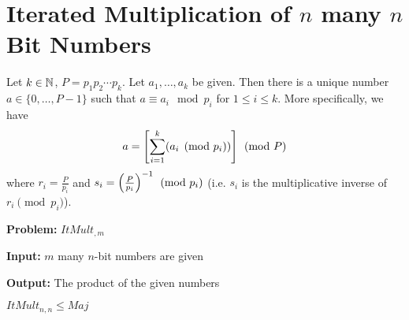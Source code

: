 \section{Iterated Multiplication of $n$ many $n$ Bit Numbers}

\begin{theorem}
	Let $k\in \mathbb{N}$, $P=p_1p_2\cdots p_k$. Let $a_1,\dots, a_k$ be given. Then there is a unique number $a\in \{0,\dots, P-1\}$ such that $a\equiv a_i\mod{p_i}$ for $1\leq i\leq k$. More specifically, we have $$a=\left[ \sum_{i=1}^k (a_i\pmod{p_i}) \right]\pmod{P}$$where $r_i=\frac{P}{p_i}$ and $s_i=\left(\frac{P}{p_i}\right)^{-1} \pmod{p_i}$ (i.e. $s_i$ is the multiplicative inverse of $r_i\pmod{p_i}$).
\end{theorem}
\parinf
\textbf{Problem:} $ItMult_{,m}$

\textbf{Input:} $m$ many $n$-bit numbers are given

\textbf{Output:} The product of the given numbers

\parinn

\begin{theorem}
	$ItMult_{n,n}\leq Maj$
\end{theorem}